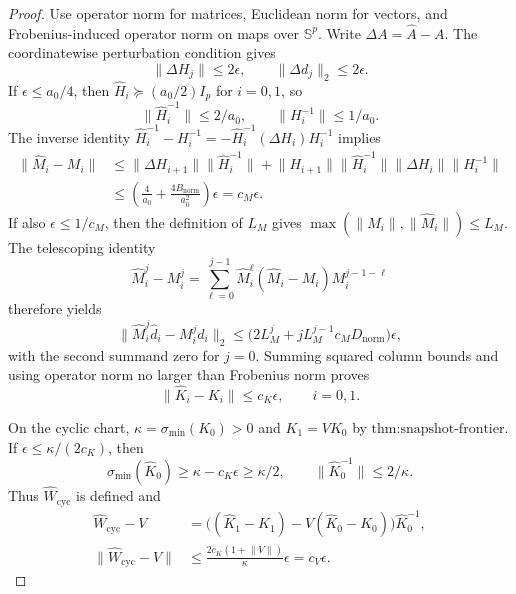 \documentclass{article}
\begin{document}
\begin{proof}
Use operator norm for matrices, Euclidean norm for vectors, and Frobenius-induced operator norm on maps over \(\mathbb S^p\).  Write \(\Delta A=\widehat A-A\).  The coordinatewise perturbation condition gives
\[
 \lVert\Delta H_j\rVert\leq2\epsilon,\qquad
 \lVert\Delta d_j\rVert_2\leq2\epsilon.
\]
If \(\epsilon\leq a_0/4\), then \(\widehat H_i\succeq(a_0/2)I_p\) for \(i=0,1\), so
\[
 \lVert\widehat H_i^{-1}\rVert\leq2/a_0,\qquad
 \lVert H_i^{-1}\rVert\leq1/a_0.
\]
The inverse identity \(\widehat H_i^{-1}-H_i^{-1}=-\widehat H_i^{-1}(\Delta H_i)H_i^{-1}\) implies
\[
 \begin{aligned}
 \lVert\widehat M_i-M_i\rVert
 &\leq \lVert\Delta H_{i+1}\rVert\lVert\widehat H_i^{-1}\rVert
 +\lVert H_{i+1}\rVert\lVert\widehat H_i^{-1}\rVert
   \lVert\Delta H_i\rVert\lVert H_i^{-1}\rVert\\
 &\leq\left(\frac4{a_0}+\frac{4B_{\mathrm{norm}}}{a_0^2}\right)\epsilon
 =c_M\epsilon.
 \end{aligned}
\]
If also \(\epsilon\leq1/c_M\), then the definition of \(L_M\) gives \(\max(\lVert M_i\rVert,\lVert\widehat M_i\rVert)\leq L_M\).  The telescoping identity
\[
 \widehat M_i^j-M_i^j
 =\sum_{\ell=0}^{j-1}\widehat M_i^\ell
 (\widehat M_i-M_i)M_i^{j-1-\ell}
\]
therefore yields
\[
 \lVert\widehat M_i^j\widehat d_i-M_i^jd_i\rVert_2
 \leq\bigl(2L_M^j+jL_M^{j-1}c_MD_{\mathrm{norm}}\bigr)\epsilon,
\]
with the second summand zero for \(j=0\).  Summing squared column bounds and using operator norm no larger than Frobenius norm proves
\[
 \lVert\widehat K_i-K_i\rVert\leq c_K\epsilon,\qquad i=0,1.
\]

On the cyclic chart, \(\kappa=\sigma_{\min}(K_0)>0\) and \(K_1=VK_0\) by \(\text{thm:snapshot-frontier}\).  If \(\epsilon\leq\kappa/(2c_K)\), then
\[
 \sigma_{\min}(\widehat K_0)\geq\kappa-c_K\epsilon\geq\kappa/2,
 \qquad \lVert\widehat K_0^{-1}\rVert\leq2/\kappa.
\]
Thus \(\widehat W_{\mathrm{cyc}}\) is defined and
\[
 \begin{aligned}
 \widehat W_{\mathrm{cyc}}-V
 &=\bigl((\widehat K_1-K_1)-V(\widehat K_0-K_0)\bigr)\widehat K_0^{-1},\\
 \lVert\widehat W_{\mathrm{cyc}}-V\rVert
 &\leq\frac{2c_K(1+\lVert V\rVert)}\kappa\epsilon=c_V\epsilon.
 \end{aligned}
\]


\end{proof}
\end{document}
